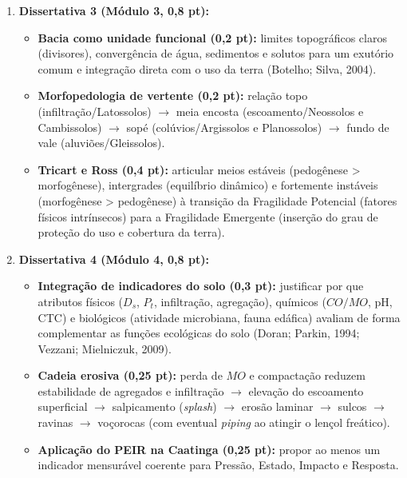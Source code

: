 \begin{boxConceito}
\begin{enumerate}[leftmargin=1.6em, itemsep=5pt]
  \item \textbf{Dissertativa 3 (Módulo 3, 0,8 pt):}
  \begin{itemize}[leftmargin=1.4em, itemsep=1pt, topsep=2pt]
    \item \textbf{Bacia como unidade funcional (0,2 pt):} limites topográficos claros (divisores), convergência de água, sedimentos e solutos para um exutório comum e integração direta com o uso da terra (Botelho; Silva, 2004).
    \item \textbf{Morfopedologia de vertente (0,2 pt):} relação topo (infiltração/Latossolos) $\to$ meia encosta (escoamento/Neossolos e Cambissolos) $\to$ sopé (colúvios/Argissolos e Planossolos) $\to$ fundo de vale (aluviões/Gleissolos).
    \item \textbf{Tricart e Ross (0,4 pt):} articular meios estáveis (pedogênese > morfogênese), intergrades (equilíbrio dinâmico) e fortemente instáveis (morfogênese > pedogênese) à transição da Fragilidade Potencial (fatores físicos intrínsecos) para a Fragilidade Emergente (inserção do grau de proteção do uso e cobertura da terra).
  \end{itemize}

  \item \textbf{Dissertativa 4 (Módulo 4, 0,8 pt):}
  \begin{itemize}[leftmargin=1.4em, itemsep=1pt, topsep=2pt]
    \item \textbf{Integração de indicadores do solo (0,3 pt):} justificar por que atributos físicos ($D_s$, $P_t$, infiltração, agregação), químicos ($CO/MO$, pH, CTC) e biológicos (atividade microbiana, fauna edáfica) avaliam de forma complementar as funções ecológicas do solo (Doran; Parkin, 1994; Vezzani; Mielniczuk, 2009).
    \item \textbf{Cadeia erosiva (0,25 pt):} perda de $MO$ e compactação reduzem estabilidade de agregados e infiltração $\to$ elevação do escoamento superficial $\to$ salpicamento (\textit{splash}) $\to$ erosão laminar $\to$ sulcos $\to$ ravinas $\to$ voçorocas (com eventual \textit{piping} ao atingir o lençol freático).
    \item \textbf{Aplicação do PEIR na Caatinga (0,25 pt):} propor ao menos um indicador mensurável coerente para Pressão, Estado, Impacto e Resposta.
  \end{itemize}


\end{enumerate}
\end{boxConceito}
